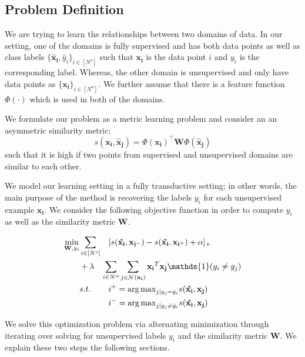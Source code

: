 \subsection{Problem Definition}
We are trying to learn the relationships between two domains of data. In our setting, one of the domains is fully supervised and has both data points as well as class labels $\{\mathbf{\hat{x}_i}, \hat{y}_i\}_{i \in [N^s]}$ such that $\mathbf{x_i}$ is the data point $i$ and $y_i$ is the corresponding label. Whereas, the other domain is unsupervised and only have data points as $\{\mathbf{x_i}\}_{i \in [N^u]}$. We further assume that there is a feature function $\Phi(\cdot)$ which is used in both of the domains.

We formulate our problem as a metric learning problem and consider an an asymmetric similarity metric;
\begin{equation}
s(\mathbf{x_i}, \mathbf{\hat{x}_j}) = \Phi(\mathbf{x_i})^\intercal \mathbf{W} \Phi(\mathbf{\hat{x}_j})
\end{equation}
such that it is high if two points from supervised and unsupervised domains are similar to each other.

We model our learning setting in a fully transductive setting; in other words, the main purpose of the method is recovering the labels $y_i$ for each unsupervised example $\mathbf{x_i}$. We consider the following objective function in order to compute $y_i$ as well as the similarity metric $\mathbf{W}$.

\begin{equation}
\begin{aligned}
\min_{\mathbf{W}, y_i} &\sum_{i \in [N^s]} &&[s(\mathbf{\hat{x_i}},\mathbf{x_{i^-}}) - s(\mathbf{\hat{x_i}},\mathbf{x_{i^+}}) + \alpha]_{+}  \\
&+\lambda &&\hspace{-3mm}\sum_{i \in N^u} \sum_{j \in \mathcal{N}(\mathbf{x_i})}  \mathbf{x_i}^T \mathbf{x_j}\mathds{1}(y_i \neq y_j)\\
&s.t. \quad &&i^{+} = {\arg\max}_{j | y_j = \hat{y}_i} s(\mathbf{\hat{x_i}},\mathbf{x_{j}}) \\
&\quad &&i^{-} = {\arg\max}_{j | y_j \neq \hat{y}_i} s(\mathbf{\hat{x_i}},\mathbf{x_{j}}) 
\end{aligned}
\label{loss}
\end{equation}

We solve this optimization problem via alternating minimization through iterating over solving for unsupervised labels $y_i$ and the similarity metric $\mathbf{W}$. We explain these two steps the following sections.

